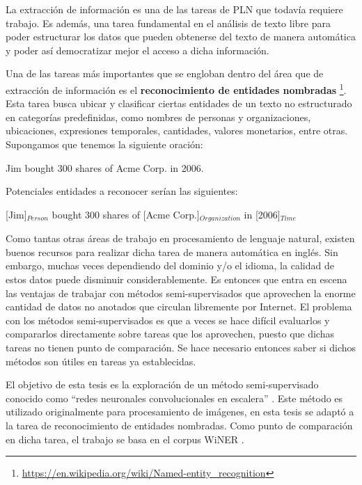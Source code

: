 La extracción de información es una de las tareas de PLN que todavía requiere trabajo. Es además, una tarea fundamental en el análisis de texto libre para poder estructurar los datos que pueden obtenerse del texto de manera automática y poder así democratizar mejor el acceso a dicha información. 

Una de las tareas más importantes que se engloban dentro del área que de extracción de información es el \textbf{reconocimiento de entidades nombradas} \footnote{\url{https://en.wikipedia.org/wiki/Named-entity_recognition}}. Esta tarea busca ubicar y clasificar ciertas entidades de un texto no estructurado en categorías predefinidas, como  nombres de personas y organizaciones, ubicaciones, expresiones temporales, cantidades, valores monetarios, entre otras. Supongamos que tenemos la siguiente oración:

\vspace{2.5mm}

Jim bought 300 shares of Acme Corp. in 2006.

\vspace{2.5mm}

Potenciales entidades a reconocer serían las siguientes:

\vspace{2.5mm}

[Jim]$_{Person}$ bought 300 shares of [Acme Corp.]$_{Organization}$ in [2006]$_{Time}$

\vspace{5mm}

Como tantas otras áreas de trabajo en procesamiento de lenguaje natural, existen buenos recursos para realizar dicha tarea de manera automática en inglés. Sin embargo, muchas veces dependiendo del dominio y/o el idioma, la calidad de estos datos puede disminuir considerablemente. Es entonces que entra en escena las ventajas de trabajar con métodos semi-supervisados que aprovechen la enorme cantidad de datos no anotados que circulan libremente por Internet. El problema con los métodos semi-supervisados es que a veces se hace difícil evaluarlos y compararlos directamente sobre tareas que los aprovechen, puesto que dichas tareas no tienen punto de comparación. Se hace necesario entonces saber si dichos métodos son útiles en tareas ya establecidas.

El objetivo de esta tesis es la exploración de un método semi-supervisado conocido como ``redes neuronales convolucionales en escalera'' \cite{DBLP:journals/corr/RasmusVHBR15}. Este método es utilizado originalmente para procesamiento de imágenes, en esta tesis se adaptó a la tarea de reconocimiento de entidades nombradas. Como punto de comparación en dicha tarea, el trabajo se basa en el corpus WiNER \cite{WiNER-Ghaddar-Langlais}.

